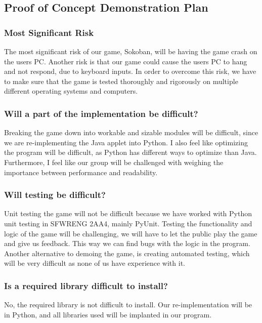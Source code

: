 \documentclass{article}
\begin{document}
\subsection{Proof of Concept Demonstration Plan}

\subsubsection{Most Significant Risk}

The most significant risk of our game, Sokoban, will be having the game crash on the users PC. Another risk is that our game could cause the users PC to hang and not respond, due to keyboard inputs.  In order to overcome this risk, we have to make sure that the game is tested thoroughly and rigorously on multiple different operating systems and computers.

\subsubsection{Will a part of the implementation be difficult?}

Breaking the game down into workable and sizable modules will be difficult, since we are re-implementing the Java applet into Python. I also feel like optimizing the program will be difficult, as Python has different ways to optimize than Java. Furthermore, I feel like our group will be challenged with weighing the importance between performance and readability.

\subsubsection{Will testing be difficult?}

Unit testing the game will not be difficult because we have worked with Python unit testing in SFWRENG 2AA4, mainly PyUnit. Testing the functionality and logic of the game will be challenging, we will have to let the public play the game and give us feedback. This way we can find bugs with the logic in the program. Another alternative to demoing the game, is creating automated testing, which will be very difficult as none of us have experience with it.

\subsubsection{Is a required library difficult to install?}

No, the required library is not difficult to install. Our re-implementation will be in Python, and all libraries used will be implanted in our program.
\end{document}

